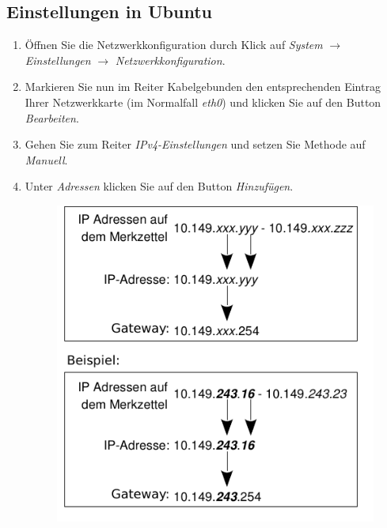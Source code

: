 \documentclass[a4paper,12pt]{scrartcl}
\begin{document}
\subsection*{Einstellungen in Ubuntu}
\begin{enumerate}
    \item Öffnen Sie die Netzwerkkonfiguration durch Klick auf \emph{System} $\rightarrow$ \emph{Einstellungen} $\rightarrow$ \emph{Netzwerkkonfiguration}.
    \item Markieren Sie nun im Reiter Kabelgebunden den entsprechenden Eintrag Ihrer Netzwerkkarte (im Normalfall \emph{eth0}) und klicken Sie auf den Button \emph{Bearbeiten}.
    \item Gehen Sie zum Reiter \emph{IPv4-Einstellungen} und setzen Sie Methode auf \emph{Manuell}.
    \item Unter \emph{Adressen} klicken Sie auf den Button \emph{Hinzufügen}.
      \begin{figure}[h!]
        \centering
        \begin{minipage}[c]{0.45\linewidth}
          \centering
          \includegraphics[width=\linewidth,keepaspectratio]{Bilder/IP_Gerneric}
        \end{minipage}
        \begin{minipage}[c]{0.5\linewidth}
          \centering

\end{minipage}
\end{figure}
\end{enumerate}
\end{document}
